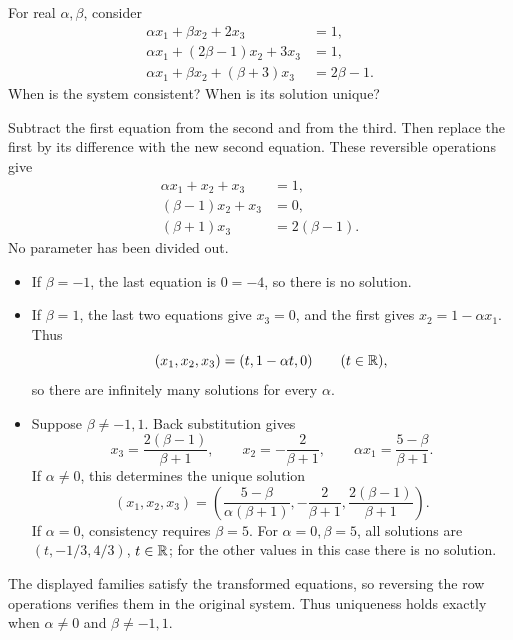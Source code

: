 \begin{problem}\label{ex:04:parameters}
For real \(\alpha,\beta\), consider
\[
\begin{aligned}
\alpha x_1+\beta x_2+2x_3&=1,\\
\alpha x_1+(2\beta-1)x_2+3x_3&=1,\\
\alpha x_1+\beta x_2+(\beta+3)x_3&=2\beta-1.
\end{aligned}
\]
When is the system consistent? When is its solution unique?
\end{problem}
\begin{solution}
Subtract the first equation from the second and from the third.
Then replace the first by its difference with the new second equation.
These reversible operations give
\[
\begin{aligned}
\alpha x_1+x_2+x_3&=1,\\
(\beta-1)x_2+x_3&=0,\\
(\beta+1)x_3&=2(\beta-1).
\end{aligned}
\]
No parameter has been divided out.
\begin{itemize}
\item If \(\beta=-1\), the last equation is \(0=-4\), so there is no solution.
\item If \(\beta=1\), the last two equations give \(x_3=0\), and the first gives
\(x_2=1-\alpha x_1\). Thus
\[
(x_1,x_2,x_3)=(t,1-\alpha t,0)\qquad(t\in\mathbb R),
\]
so there are infinitely many solutions for every \(\alpha\).
\item Suppose \(\beta\ne-1,1\). Back substitution gives
\[
x_3=\frac{2(\beta-1)}{\beta+1},\qquad
x_2=-\frac{2}{\beta+1},\qquad
\alpha x_1=\frac{5-\beta}{\beta+1}.
\]
If \(\alpha\ne0\), this determines the unique solution
\[
(x_1,x_2,x_3)=
\left(\frac{5-\beta}{\alpha(\beta+1)},
      -\frac{2}{\beta+1},\frac{2(\beta-1)}{\beta+1}\right).
\]
If \(\alpha=0\), consistency requires \(\beta=5\).
For \(\alpha=0,\beta=5\), all solutions are
\((t,-1/3,4/3)\), \(t\in\mathbb R\); for the other values in this case there is no solution.
\end{itemize}
The displayed families satisfy the transformed equations, so reversing
the row operations verifies them in the original system.
Thus uniqueness holds exactly when \(\alpha\ne0\) and \(\beta\ne-1,1\).
\end{solution}
